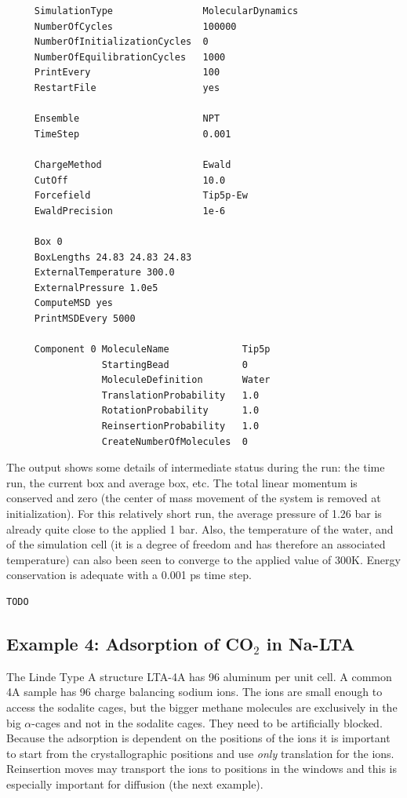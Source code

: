 \begin{tiny}
\begin{verbatim}
     SimulationType                MolecularDynamics
     NumberOfCycles                100000
     NumberOfInitializationCycles  0
     NumberOfEquilibrationCycles   1000
     PrintEvery                    100
     RestartFile                   yes

     Ensemble                      NPT
     TimeStep                      0.001

     ChargeMethod                  Ewald
     CutOff                        10.0
     Forcefield                    Tip5p-Ew
     EwaldPrecision                1e-6

     Box 0
     BoxLengths 24.83 24.83 24.83
     ExternalTemperature 300.0
     ExternalPressure 1.0e5
     ComputeMSD yes
     PrintMSDEvery 5000

     Component 0 MoleculeName             Tip5p
                 StartingBead             0
                 MoleculeDefinition       Water
                 TranslationProbability   1.0
                 RotationProbability      1.0
                 ReinsertionProbability   1.0
                 CreateNumberOfMolecules  0
\end{verbatim}
\end{tiny}

The output shows some details of intermediate status during the run: the time run, the current box and average box, etc.
The total linear momentum is conserved and zero (the center of mass movement of the system is removed at initialization).
For this relatively short run, the average pressure of 1.26 bar is already quite close to the applied 1 bar.
Also, the temperature of the water, and of the simulation cell (it is a degree of freedom and has therefore an associated temperature)
can also been seen to converge to the applied value of 300K. Energy conservation is adequate with a 0.001 ps time step.
\begin{tiny}
\begin{verbatim}
TODO
\end{verbatim}
\end{tiny}


\subsection*{Example 4: Adsorption of CO$_2$ in Na-LTA}

The Linde Type A structure LTA-4A has 96 aluminum per unit cell. A common 4A sample has 96 charge balancing sodium ions.
The ions are small enough to access the sodalite cages, but the bigger methane molecules are exclusively in the big $\alpha$-cages
and not in the sodalite cages. They need to be artificially blocked. 
Because the adsorption is dependent on the positions of the ions it is
important to start from the crystallographic positions and use \emph{only} translation for the ions. Reinsertion moves may transport the ions
to positions in the windows and this is especially important for diffusion (the next example).

